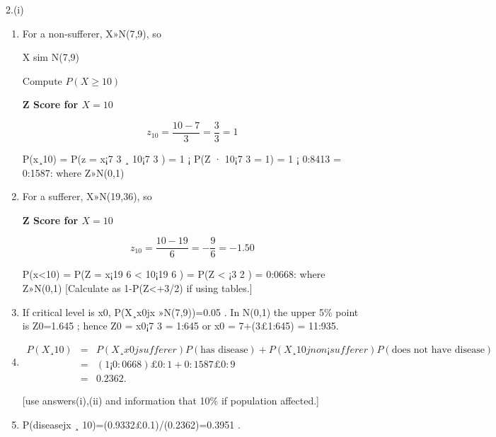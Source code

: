 \documentclass[a4paper,12pt]{article}
\begin{document}
2.(i)
\begin{enumerate}
\item For a non-sufferer, X»N(7,9), so


X sim N(7,9)

Compute $P(X \geq 10)$

\begin{framed}

\noindent \textbf{Z Score for $X = 10$}

\[z_{10}  = \frac{10-7}{ 3}  = \frac{3}{3} = 1\]
\end{framed}

P(x¸10) = P(z = x¡7
3 ¸ 10¡7
3 )
= 1 ¡ P(Z · 10¡7
3 = 1)
= 1 ¡ 0:8413
= 0:1587:
where Z»N(0,1)
\item For a sufferer, X»N(19,36), so


\begin{framed}

\noindent \textbf{Z Score for $X = 10$}

\[z_{10}  = \frac{10-19}{ 6}  = -\frac{9}{6} = -1.50\]
\end{framed}

P(x<10) = P(Z = x¡19
6 < 10¡19
6 )
= P(Z < ¡3
2 ) = 0:0668:
where Z»N(0,1)
[Calculate as 1-P(Z<+3/2) if using tables.]
\item If critical level is x0, P(X¸x0jx »N(7,9))=0.05 .
In N(0,1) the upper 5\% point is Z0=1.645 ; hence Z0 = x0¡7
3 = 1:645 or x0 = 7+(3£1:645) =
11:935.
\item 

\begin{eqnarray*}
P(X¸10) &=& P(X ¸ x0jsufferer)P(\mbox{has disease}) + P(X ¸ 10jnon ¡ sufferer)P(\mbox{does not have disease})\\
&=& (1 ¡ 0:0668) £ 0:1 + 0:1587 £ 0:9\\
&=& 0.2362.
\end{eqnarray*}

[use answers(i),(ii) and information that 10\% if population affected.]
\item P(diseasejx ¸ 10)=(0.9332£0.1)/(0.2362)=0.3951 .
\end{enumerate}
\end{document}

